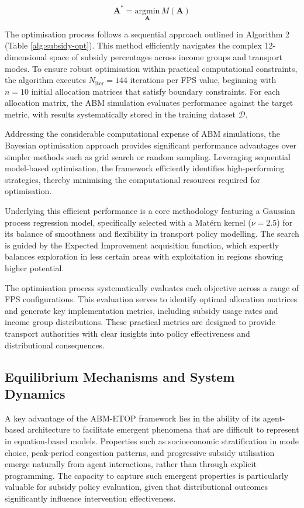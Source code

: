 \documentclass[a4paper,fleqn]{cas-sc}
\begin{document}
\begin{equation}
\mathbf{A}^* = \underset{\mathbf{A}}{\text{argmin}} \, M(\mathbf{A})
\end{equation}

The optimisation process follows a sequential approach outlined in Algorithm 2 (Table \ref{alg:subsidy-opt}). This method efficiently navigates the complex 12-dimensional space of subsidy percentages across income groups and transport modes. To ensure robust optimisation within practical computational constraints, the algorithm executes $N_{\text{iter}} = 144$ iterations per FPS value, beginning with $n = 10$ initial allocation matrices that satisfy boundary constraints. For each allocation matrix, the ABM simulation evaluates performance against the target metric, with results systematically stored in the training dataset $\mathcal{D}$.

Addressing the considerable computational expense of ABM simulations, the Bayesian optimisation approach provides significant performance advantages over simpler methods such as grid search or random sampling. Leveraging sequential model-based optimisation, the framework efficiently identifies high-performing strategies, thereby minimising the computational resources required for optimisation.

Underlying this efficient performance is a core methodology featuring a Gaussian process regression model, specifically selected with a Matérn kernel ($\nu = 2.5$) for its balance of smoothness and flexibility in transport policy modelling. The search is guided by the Expected Improvement acquisition function, which expertly balances exploration in less certain areas with exploitation in regions showing higher potential.

The optimisation process systematically evaluates each objective across a range of FPS configurations. This evaluation serves to identify optimal allocation matrices and generate key implementation metrics, including subsidy usage rates and income group distributions. These practical metrics are designed to provide transport authorities with clear insights into policy effectiveness and distributional consequences.

\subsection{Equilibrium Mechanisms and System Dynamics}
A key advantage of the ABM-ETOP framework lies in the ability of its agent-based architecture to facilitate emergent phenomena that are difficult to represent in equation-based models. Properties such as socioeconomic stratification in mode choice, peak-period congestion patterns, and progressive subsidy utilisation emerge naturally from agent interactions, rather than through explicit programming. The capacity to capture such emergent properties is particularly valuable for subsidy policy evaluation, given that distributional outcomes significantly influence intervention effectiveness.
\end{document}
